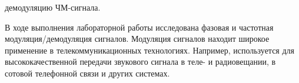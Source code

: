 \documentclass[a4paper,12pt]{article}
\begin{document}
\begin{enumerate}
{ демодуляцию ЧМ-сигнала.
\\}

{\bfseries{}}

В ходе выполнения лабораторной работы исследована фазовая и частотная модуляция/демодуляция сигналов. Модуляция сигналов находит широкое применение в телекоммуникационных технологиях. Например, используется для высококачественной передачи звукового сигнала в теле- и радиовещании, в сотовой телефонной связи и других системах.

\end{enumerate}
\end{document}
